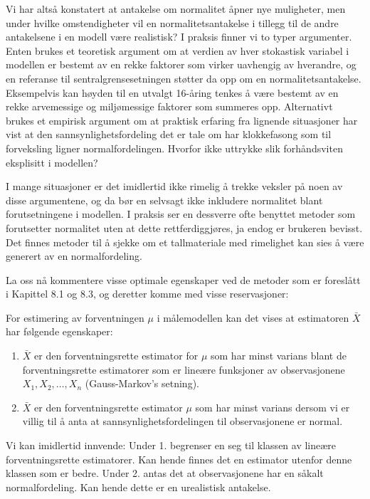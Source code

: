 Vi har altså konstatert at antakelse om normalitet åpner
nye muligheter, men under hvilke omstendigheter vil en
normalitetsantakelse i tillegg til de andre antakelsene i en
modell være realistisk? I praksis finner vi to typer
argumenter. Enten brukes et teoretisk argument om at verdien av
hver stokastisk variabel i modellen er bestemt av en rekke
faktorer som virker uavhengig av hverandre, og en referanse til
sentralgrensesetningen støtter da opp om en
normalitetsantakelse. Eksempelvis kan høyden til en utvalgt
16-åring tenkes å være bestemt av en rekke
arvemessige og miljømessige faktorer som summeres opp.
Alternativt brukes et empirisk argument om at praktisk erfaring
fra lignende situasjoner har vist at den
sannsynlighetsfordeling det er tale om har klokkefasong som til
forveksling ligner normalfordelingen. Hvorfor ikke uttrykke
slik forhåndsviten eksplisitt i modellen?

I mange situasjoner er det imidlertid ikke rimelig å trekke
veksler på noen av disse argumentene, og da bør en
selvsagt ikke inkludere normalitet blant forutsetningene i
modellen. I praksis ser en dessverre ofte benyttet metoder som
forutsetter normalitet uten at dette rettferdiggjøres, ja
endog er brukeren bevisst. Det finnes metoder til å sjekke om
et tallmateriale med rimelighet kan sies å være generert
av en normalfordeling.

La oss nå kommentere visse optimale egenskaper ved de metoder
som er foreslått i Kapittel 8.1 og 8.3, og deretter komme med
visse reservasjoner:

For estimering av forventningen $\mu$ i målemodellen kan det
vises at estimatoren $\bar X$ har følgende egenskaper:
\begin{enumerate}
\item $\bar X$ er den forventningsrette estimator for $\mu$ som har
minst varians blant de forventningsrette estimatorer som er
lineære funksjoner av observasjonene $X_1,X_2,\ldots ,X_n$
(Gauss-Markov's setning).
\item $\bar X$ er den forventningsrette estimator $\mu$ som har
minst varians dersom vi er villig til å anta at
sannsynlighetsfordelingen til observasjonene er normal.
\end{enumerate}
Vi kan imidlertid innvende: Under 1. begrenser en seg til klassen
av lineære forventningsrette estimatorer. Kan hende finnes
det en estimator utenfor denne klassen som er bedre. Under 2.
antas det at observasjonene har en såkalt normalfordeling.
Kan hende dette er en urealistisk antakelse.

